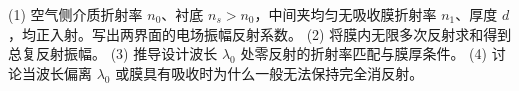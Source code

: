 (1) 空气侧介质折射率 \(n_0\)、衬底 \(n_s>n_0\)，中间夹均匀无吸收膜折射率 \(n_1\)、厚度 \(d\)，均正入射。写出两界面的电场振幅反射系数。
(2) 将膜内无限多次反射求和得到总复反射振幅。
(3) 推导设计波长 \(\lambda_0\) 处零反射的折射率匹配与膜厚条件。
(4) 讨论当波长偏离 \(\lambda_0\) 或膜具有吸收时为什么一般无法保持完全消反射。
